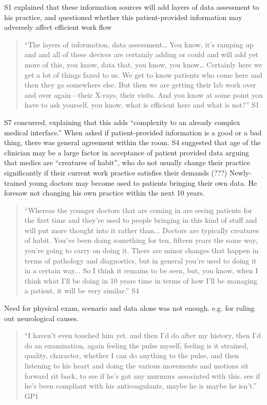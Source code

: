\documentclass{sigchi}
\begin{document}
S1 explained that these information sources will add layers of data assessment to his practice, and questioned whether this patient-provided information may adversely affect efficient work flow

\begin{quote}
    ``The layers of information, data assessment… You know, it's ramping up and and  all of these devices are certainly adding or could and will add yet more of this, you know, data that, you know, you know…  Certainly here we get a lot of things faxed to us. We get to know patients who come here and then they go somewhere else.  But then we are getting their lab work over and over again—their X-rays, their visits. And you know at some point you have to ask yourself, you know, what is efficient here and what is not?'' S1
\end{quote}

S7 concurred, explaining that this adds ``complexity to an already complex medical interface.'' When asked if patient-provided information is a good or a bad thing, there was general agreement within the room. S4 suggested that age of the clinician may be a large factor in acceptance of patient provided data arguing that medics are ``creatures of habit'', who do not usually change their practice significantly if their current work practice satisfies their demands (???)   Newly-trained young doctors may become used to patients bringing their own data. He foresaw not changing his own practice within the next 10 years.

\begin{quote}
    ``Whereas the younger doctors that are coming in are seeing patients for the first time and they're used to people bringing in this kind of stuff and will put more thought into it rather than... Doctors are typically creatures of habit. You've been doing something for ten, fifteen years the same way, you're going to carry on doing it. There are minor changes that happen in terms of pathology and diagnostics, but in general you're used to doing it in a certain way... So I think it remains to be seen, but, you know, when I think what I'll be doing in 10 years time in terms of how I'll be managing a patient, it will be very similar.'' S4
\end{quote}

Need for physical exam, scenario and data alone was not enough. e.g. for ruling out neurological causes.

\begin{quote}
    ``I haven't even touched him yet. and then I'd do after my history, then I'd do an examination, again feeling the pulse myself, feeling is it strained, quality, character, whether I can do anything to the pulse, and then listening to his heart and doing the various movements and motions sit forward sit back, to see if he's got any murmurs associated with this. see if he's been compliant with his anticoagulants, maybe he is maybe he isn't.'' GP1
\end{quote}
\end{document}

